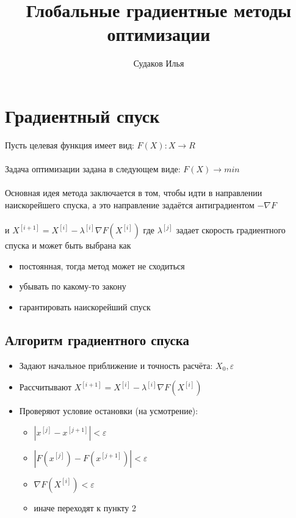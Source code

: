 \documentclass{article}
\title{Глобальные градиентные методы оптимизации}
\author{Судаков Илья}
\begin{document}
    \maketitle



    \newpage


    \section{Градиентный спуск}
    Пусть целевая функция имеет вид:
    $F(X): X \rightarrow R$\\\\
    Задача оптимизации задана в следующем виде:
    $F(X) \xrightarrow{} min$\\\\
    Основная идея метода заключается в том, чтобы идти в направлении наискорейшего спуска, а это направление задаётся антиградиентом $-\nabla F$\\\\
    и $X^{[i+1]}=X^{[i]}-\lambda^{[i]}\nabla F(X^{[i]})$
    где $\lambda ^{[j]}$ задает скорость градиентного спуска и может быть выбрана как
    \begin{itemize}
        \item постоянная, тогда метод может не сходиться
        \item убывать по какому-то закону
        \item гарантировать наискорейший спуск
    \end{itemize}

    \subsection{Алгоритм градиентного спуска}
    \begin{itemize}
        \item Задают начальное приближение и точность расчёта: $X_0, \varepsilon$
        \item Рассчитывают $X^{[i+1]}=X^{[i]}-\lambda^{[i]}\nabla F(X^{[i]})$
        \item Проверяют условие остановки (на усмотрение):
        \begin{itemize}
            \item $|x^{[j]}-x^{[j+1]}|<\varepsilon$
            \item $|F(x^{[j]})-F(x^{[j+1]})|
            <\varepsilon$
            \item $\nabla F(X^{[i]})<\varepsilon$
            \item иначе переходят к пункту 2
        \end{itemize}
    \end{itemize}
\end{document}
